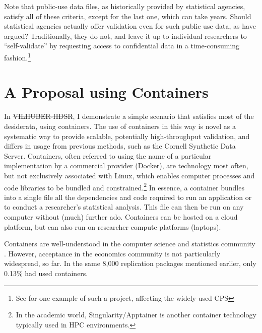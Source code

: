 \documentclass[12pt]{article}
\providecommand{\DIFaddtex}[1]{{\protect\color{blue}\uwave{#1}}} %
\providecommand{\DIFdeltex}[1]{{\protect\color{red}\sout{#1}}} %
\providecommand{\DIFaddbegin}{} %
\providecommand{\DIFaddend}{} %
\providecommand{\DIFdelbegin}{} %
\providecommand{\DIFdelend}{} %
\providecommand{\DIFadd}[1]{\texorpdfstring{\DIFaddtex{#1}}{#1}} %
\providecommand{\DIFdel}[1]{\texorpdfstring{\DIFdeltex{#1}}{}} %
\newcommand{\DIFscaledelfig}{0.5}
\newlength{\DIFdelgraphicswidth} %
\newlength{\DIFdelgraphicsheight} %
\newcommand{\DIFaddincludegraphics}[2][]{{\color{blue}\fbox{\DIFOincludegraphics[#1]{#2}}}} %
\newcommand{\DIFdelincludegraphics}[2][]{%
\sbox{\DIFdelgraphicsbox}{\DIFOincludegraphics[#1]{#2}}%
\settoboxwidth{\DIFdelgraphicswidth}{\DIFdelgraphicsbox} %
\settoboxtotalheight{\DIFdelgraphicsheight}{\DIFdelgraphicsbox} %
\scalebox{\DIFscaledelfig}{%
\parbox[b]{\DIFdelgraphicswidth}{\usebox{\DIFdelgraphicsbox}\\[-\baselineskip] \rule{\DIFdelgraphicswidth}{0em}}\llap{\resizebox{\DIFdelgraphicswidth}{\DIFdelgraphicsheight}{%
\setlength{\unitlength}{\DIFdelgraphicswidth}%
\begin{picture}(1,1)%
\thicklines\linethickness{2pt} %
{\color[rgb]{1,0,0}\put(0,0){\framebox(1,1){}}}%
{\color[rgb]{1,0,0}\put(0,0){\line( 1,1){1}}}%
{\color[rgb]{1,0,0}\put(0,1){\line(1,-1){1}}}%
\end{picture}%
}\hspace*{3pt}}} %
} %
\DeclareRobustCommand{\DIFaddbegin}{\DIFOaddbegin \let\includegraphics\DIFaddincludegraphics} %
\DeclareRobustCommand{\DIFaddend}{\DIFOaddend \let\includegraphics\DIFOincludegraphics} %
\DeclareRobustCommand{\DIFdelbegin}{\DIFOdelbegin \let\includegraphics\DIFdelincludegraphics} %
\DeclareRobustCommand{\DIFdelend}{\DIFOaddend \let\includegraphics\DIFOincludegraphics} %
\begin{document}
Note that public-use data files, as historically provided by statistical agencies, satisfy all of these criteria, except for the last one, which can take years. Should statistical agencies actually offer validation even for such public use data, as \citet{reiter_verification_2009} have argued? Traditionally, they do not, and leave it up to individual researchers to ``self-validate'' by requesting access to confidential data in a time-consuming fashion.\footnote{See \cite{armour_using_2016} for one example of such a project, affecting the widely-used \ac{CPS}}

\section{A Proposal using Containers}
\label{sec:proposal}

In \DIFdelbegin \DIFdel{VILHUBER-HDSR}\DIFdelend \DIFaddbegin \DIFadd{\mbox{%
\citet{vilhuber2025e}}\hskip0pt%
}\DIFaddend , I demonstrate a simple scenario that satisfies most of the desiderata,  using containers. 
%
The use of containers in this way is novel as a systematic way to provide scalable, potentially high-throughput validation, and differs in usage from previous methods, such as the Cornell Synthetic Data Server. 
%
Containers, often referred to using the name of a particular implementation by a commercial provider (Docker), are technology most often, but not exclusively associated with Linux, which enables computer processes and code libraries to be bundled and constrained.\footnote{In the academic world, Singularity/Apptainer is another container technology typically used in \ac{HPC} environments.} In essence, a container bundles into a single file all the dependencies and code required to run an application or to conduct a researcher's statistical analysis. This file can then be run on any computer without (much) further ado. Containers can be hosted on a cloud platform, but can also run  on researcher compute platforms (laptops).  

Containers are well-understood in the computer science and statistics community \citep{boettiger_introduction_2015,moreau_containers_2023}. However, acceptance in the economics community is not particularly widespread, so far. In the same 8,000 replication packages mentioned earlier, only 0.13\% had used containers. 
\end{document}
